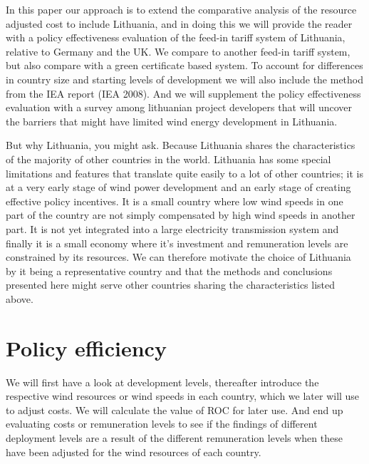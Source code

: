 \documentclass[a4paper, 12pt]{article}
\begin{document}
In this paper our approach is to extend the comparative analysis of the resource adjusted cost to include Lithuania, and in doing this we will provide the reader with a policy effectiveness evaluation of the feed-in tariff system of Lithuania, relative to Germany and the UK. We compare to another feed-in tariff system, but also compare with a green certificate based system. To account for differences in country size and starting levels of development we will also include the method from the IEA report (IEA 2008). And we will supplement the policy effectiveness evaluation with a survey among lithuanian project developers that will uncover the barriers that might have limited wind energy development in Lithuania. 

But why Lithuania, you might ask. Because Lithuania shares the characteristics of the majority of other countries in the world. Lithuania has some special limitations and features that translate quite easily to a lot of other countries; it is at a very early stage of wind power development and an early stage of creating effective policy incentives. It is a small country where low wind speeds in one part of the country are not simply compensated by high wind speeds in another part. It is not yet integrated into a large electricity transmission system and finally it is a small economy where it’s investment and remuneration levels are constrained by its resources. We can therefore motivate the choice of Lithuania by it being a representative country and that the methods and conclusions presented here might serve other countries sharing the characteristics listed above.

\section{Policy efficiency}
We will first have a look at development levels, thereafter introduce the respective wind resources or wind speeds in each country, which we later will use to adjust costs. We will calculate the value of ROC for later use. And end up evaluating costs or remuneration levels to see if the findings of different deployment levels are a result of the different remuneration levels when these have been adjusted for the wind resources of each country.
\end{document}
